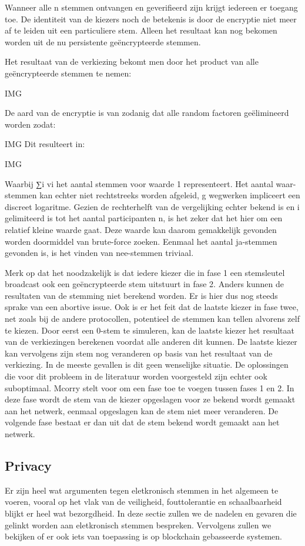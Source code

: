 			Wanneer alle n stemmen ontvangen en geverifieerd zijn krijgt iedereen er toegang toe. De identiteit van de kiezers noch de betekenis is door de encryptie niet meer af te leiden uit een particuliere stem. Alleen het resultaat kan nog bekomen worden uit de nu persistente geëncrypteerde stemmen.
			
			Het resultaat van de verkiezing bekomt men door het product van alle geëncrypteerde stemmen te nemen: 
			
			IMG
			
			De aard van de encryptie is van zodanig dat alle random factoren geëlimineerd worden zodat:
			
			IMG
			Dit resulteert in:
			
			IMG
			
			Waarbij ∑i vi  het aantal stemmen voor waarde 1 representeert. Het aantal waar-stemmen kan echter niet rechtstreeks worden afgeleid, g wegwerken impliceert een discreet logaritme. Gezien de rechterhelft van de vergelijking echter bekend is en i gelimiteerd is tot het aantal participanten n, is het zeker dat het hier om een relatief kleine waarde gaat. Deze waarde kan daarom gemakkelijk gevonden worden doormiddel van brute-force zoeken. Eenmaal het aantal ja-stemmen gevonden is, is het vinden van nee-stemmen triviaal.
			
			Merk op dat het noodzakelijk is dat iedere kiezer die in fase 1 een stemsleutel broadcast ook een geëncrypteerde stem uitstuurt in fase 2. Anders kunnen de resultaten van de stemming niet berekend worden. Er is hier dus nog steeds sprake van een abortive issue.
			Ook is er het feit dat de laatste kiezer in fase twee, net zoals bij de andere protocollen, potentieel de stemmen kan tellen alvorens zelf te kiezen. Door eerst een 0-stem te simuleren, kan de laatste kiezer het resultaat van de verkiezingen berekenen voordat alle anderen dit kunnen. De laatste kiezer kan vervolgens zijn stem nog veranderen op basis van het resultaat van de verkiezing. In de meeste gevallen is dit geen wenselijke situatie. De oplossingen die voor dit probleem in de literatuur worden voorgesteld zijn echter ook suboptimaal. Mcorry stelt voor om een fase toe te voegen tussen fases 1 en 2. In deze fase wordt de stem van de kiezer opgeslagen voor ze bekend wordt gemaakt aan het netwerk, eenmaal opgeslagen kan de stem niet meer veranderen. De volgende fase bestaat er dan uit dat de stem bekend wordt gemaakt aan het netwerk.
	
	
	\subsection{Privacy} 
		Er zijn heel wat argumenten tegen eletkronisch stemmen in het algemeen te voeren, vooral op het vlak van de veiligheid, fouttolerantie en schaalbaarheid blijkt er heel wat bezorgdheid. In deze sectie zullen we de nadelen en gevaren die gelinkt worden aan eletkronisch stemmen bespreken. Vervolgens zullen we bekijken of er ook iets van toepassing is op blockchain gebasseerde systemen.
		
